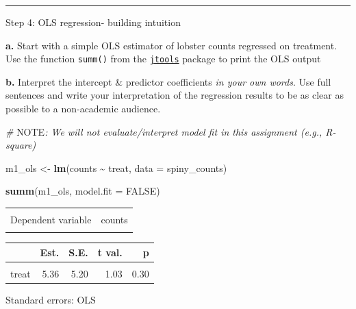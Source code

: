 \documentclass[
]{article}
\newenvironment{Shaded}{\begin{snugshade}}{\end{snugshade}}
\newcommand{\AlertTok}[1]{\textcolor[rgb]{0.94,0.16,0.16}{#1}}
\newcommand{\AttributeTok}[1]{\textcolor[rgb]{0.13,0.29,0.53}{#1}}
\newcommand{\CommentTok}[1]{\textcolor[rgb]{0.56,0.35,0.01}{\textit{#1}}}
\newcommand{\ConstantTok}[1]{\textcolor[rgb]{0.56,0.35,0.01}{#1}}
\newcommand{\FunctionTok}[1]{\textcolor[rgb]{0.13,0.29,0.53}{\textbf{#1}}}
\newcommand{\NormalTok}[1]{#1}
\newcommand{\OtherTok}[1]{\textcolor[rgb]{0.56,0.35,0.01}{#1}}
\newcommand{\SpecialCharTok}[1]{\textcolor[rgb]{0.81,0.36,0.00}{\textbf{#1}}}
\begin{document}
\begin{center}\rule{0.5\linewidth}{0.5pt}\end{center}

Step 4: OLS regression- building intuition

\textbf{a.} Start with a simple OLS estimator of lobster counts
regressed on treatment. Use the function \texttt{summ()} from the
\href{https://jtools.jacob-long.com/}{\texttt{jtools}} package to print
the OLS output

\textbf{b.} Interpret the intercept \& predictor coefficients \emph{in
your own words}. Use full sentences and write your interpretation of the
regression results to be as clear as possible to a non-academic
audience.

\begin{Shaded}
\begin{Highlighting}[]
\CommentTok{\# }\AlertTok{NOTE}\CommentTok{: We will not evaluate/interpret model fit in this assignment (e.g., R{-}square)}

\NormalTok{m1\_ols }\OtherTok{\textless{}{-}} \FunctionTok{lm}\NormalTok{(counts }\SpecialCharTok{\textasciitilde{}}\NormalTok{ treat, }\AttributeTok{data =}\NormalTok{ spiny\_counts)}

\FunctionTok{summ}\NormalTok{(m1\_ols, }\AttributeTok{model.fit =} \ConstantTok{FALSE}\NormalTok{) }
\end{Highlighting}
\end{Shaded}

\begin{table}[!h]
\centering
\begin{tabular}{lr}
\toprule
\cellcolor{gray!10}{Observations} & \cellcolor{gray!10}{252}\\
Dependent variable & counts\\
\cellcolor{gray!10}{Type} & \cellcolor{gray!10}{OLS linear regression}\\
\bottomrule
\end{tabular}
\end{table}  \begin{table}[!h]
\centering
\begin{threeparttable}
\begin{tabular}{lrrrr}
\toprule
  & Est. & S.E. & t val. & p\\
\midrule
\cellcolor{gray!10}{(Intercept)} & \cellcolor{gray!10}{22.73} & \cellcolor{gray!10}{3.57} & \cellcolor{gray!10}{6.36} & \cellcolor{gray!10}{0.00}\\
treat & 5.36 & 5.20 & 1.03 & 0.30\\
\bottomrule
\end{tabular}
\begin{tablenotes}
\item Standard errors: OLS
\end{tablenotes}
\end{threeparttable}
\end{table}
\end{document}
